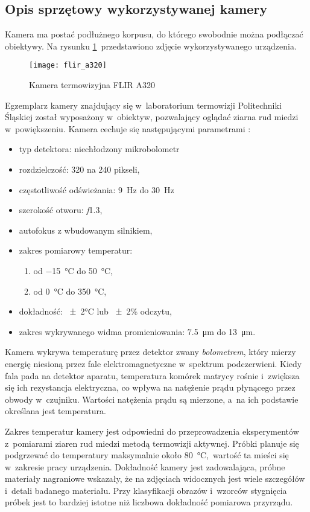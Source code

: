 \subsection{Opis sprzętowy wykorzystywanej kamery}
Kamera ma postać podłużnego korpusu, do którego swobodnie można podłączać
obiektywy.
Na rysunku \ref{fig:camera}~przedstawiono zdjęcie wykorzystywanego urządzenia.
\begin{figure}[htb]
    \centering
    \texttt{[image: flir\_a320]}
    \caption{Kamera termowizyjna FLIR A320}
    \label{fig:camera}
\end{figure}
Egzemplarz kamery znajdujący się w~laboratorium termowizji Politechniki
Śląskiej został wyposażony w~obiektyw, pozwalający oglądać ziarna rud miedzi
w~powiększeniu.
Kamera cechuje się następującymi parametrami \cite{flir_camera_specs}:
\begin{itemize}
	\item typ detektora: niechłodzony mikrobolometr
	\item rozdzielczość: 320 na 240 pikseli,
	\item częstotliwość odświeżania: \SI{9}{\hertz} do \SI{30}{\hertz}
	\item szerokość otworu: \textit{f}\num{1,3},
	\item autofokus z wbudowanym silnikiem,
	\item zakres pomiarowy temperatur: 
		\begin{enumerate}
			\item od \SI{-15}{\celsius} do \SI{+50}{\celsius},
			\item od \SI{0}{\celsius} do \SI{350}{\celsius},
		\end{enumerate}
	\item dokładność: \num{\pm2}\si{\celsius} lub \num{\pm2}\% odczytu,
	\item zakres wykrywanego widma promieniowania: \SI{7,5}{\micro\meter}
          do \SI{13}{\micro\meter}.
\end{itemize}

Kamera wykrywa temperaturę przez detektor zwany \emph{bolometrem},
który mierzy energię niesioną przez fale elektromagnetyczne w~spektrum
podczerwieni.
Kiedy fala pada na detektor aparatu, temperatura komórek matrycy rośnie
i~zwiększa się ich rezystancja elektryczna, co wpływa na natężenie prądu
płynącego przez obwody w~czujniku.
Wartości natężenia prądu są mierzone, a~na ich podstawie określana jest
temperatura.

Zakres temperatur kamery jest odpowiedni do przeprowadzenia eksperymentów
z~pomiarami ziaren rud miedzi metodą termowizji aktywnej.
Próbki planuje się podgrzewać do temperatury maksymalnie około
\SI{80}{\celsius},~wartość ta mieści się w~zakresie pracy urządzenia.
Dokładność kamery jest zadowalająca, próbne materiały nagraniowe
wskazały, że na zdjęciach widocznych jest wiele szczegółów i~detali
badanego materiału.
Przy klasyfikacji obrazów i~wzorców stygnięcia próbek jest to 
bardziej istotne niż liczbowa dokładność pomiarowa przyrządu.


